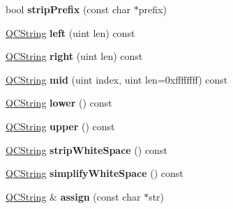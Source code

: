 \begin{DoxyCompactItemize}
\item 
\hypertarget{class_q_c_string_a8bc9337f47d29d6876ecfc0754a35334}{bool {\bfseries strip\-Prefix} (const char $\ast$prefix)}\label{class_q_c_string_a8bc9337f47d29d6876ecfc0754a35334}

\item 
\hypertarget{class_q_c_string_a35b1a3d42bf6dd05a3f9209af94095d6}{\hyperlink{class_q_c_string}{Q\-C\-String} {\bfseries left} (uint len) const }\label{class_q_c_string_a35b1a3d42bf6dd05a3f9209af94095d6}

\item 
\hypertarget{class_q_c_string_a2ce428c03c84735f3c528bd5db575d06}{\hyperlink{class_q_c_string}{Q\-C\-String} {\bfseries right} (uint len) const }\label{class_q_c_string_a2ce428c03c84735f3c528bd5db575d06}

\item 
\hypertarget{class_q_c_string_ad16ec5936b29ffc659fd782c04ecd847}{\hyperlink{class_q_c_string}{Q\-C\-String} {\bfseries mid} (uint index, uint len=0xffffffff) const }\label{class_q_c_string_ad16ec5936b29ffc659fd782c04ecd847}

\item 
\hypertarget{class_q_c_string_a8179d2032e89a637eb0fac8ce9448e0b}{\hyperlink{class_q_c_string}{Q\-C\-String} {\bfseries lower} () const }\label{class_q_c_string_a8179d2032e89a637eb0fac8ce9448e0b}

\item 
\hypertarget{class_q_c_string_aff62209714d5cb46fd05b3137557439d}{\hyperlink{class_q_c_string}{Q\-C\-String} {\bfseries upper} () const }\label{class_q_c_string_aff62209714d5cb46fd05b3137557439d}

\item 
\hypertarget{class_q_c_string_a166362f87d409c4589088eaad259626c}{\hyperlink{class_q_c_string}{Q\-C\-String} {\bfseries strip\-White\-Space} () const }\label{class_q_c_string_a166362f87d409c4589088eaad259626c}

\item 
\hypertarget{class_q_c_string_ace21d2b5997eff47967a6c081c08b168}{\hyperlink{class_q_c_string}{Q\-C\-String} {\bfseries simplify\-White\-Space} () const }\label{class_q_c_string_ace21d2b5997eff47967a6c081c08b168}

\item 
\hypertarget{class_q_c_string_aae4dbdfc6488dfb8a3e063e444f123fb}{\hyperlink{class_q_c_string}{Q\-C\-String} \& {\bfseries assign} (const char $\ast$str)}\label{class_q_c_string_aae4dbdfc6488dfb8a3e063e444f123fb}


\end{DoxyCompactItemize}
